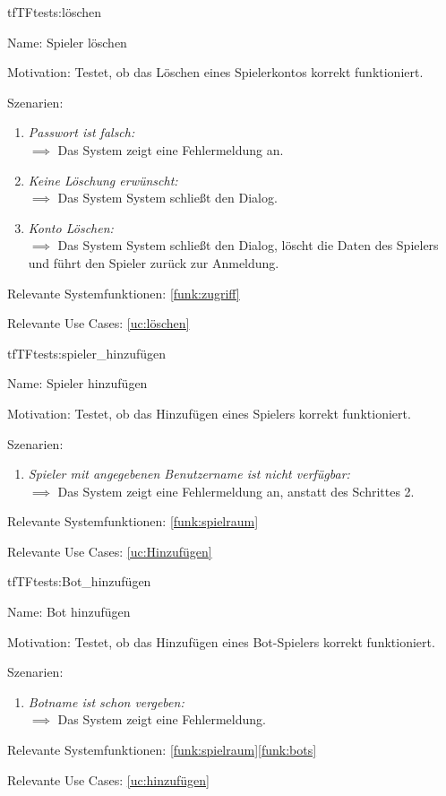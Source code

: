 \begin{description}[leftmargin=5em, style=sameline]
\begin{lhp}{tf}{TF}{tests:löschen}
	\item [Name:] Spieler löschen
	\item [Motivation:] Testet, ob das Löschen eines Spielerkontos korrekt funktioniert.
	\item [Szenarien:] \hfill
		\begin{enumerate}
		        \item \textit{Passwort ist falsch:} \\ $\implies$ Das System zeigt eine Fehlermeldung an.
				\item \textit{Keine Löschung erwünscht:} \\ $\implies$ Das System System schließt den Dialog.
				\item \textit{Konto Löschen:} \\ $\implies$ Das System System schließt den Dialog, löscht die Daten des Spielers und führt den Spieler zurück zur Anmeldung.
		\end{enumerate}
	\item [Relevante Systemfunktionen:] \ref{funk:zugriff}
	\item [Relevante Use Cases:] \ref{uc:löschen}
\end{lhp}

\begin{lhp}{tf}{TF}{tests:spieler_hinzufügen}
	\item [Name:] Spieler hinzufügen
	\item [Motivation:] Testet, ob das Hinzufügen eines Spielers korrekt funktioniert.
	\item [Szenarien:] \hfill
		\begin{enumerate}
		        \item \textit{Spieler mit angegebenen Benutzername ist nicht verfügbar:} \\ $\implies$ Das System zeigt eine Fehlermeldung an, anstatt des Schrittes 2.
		\end{enumerate}
	\item [Relevante Systemfunktionen:] \ref{funk:spielraum}
	\item [Relevante Use Cases:] \ref{uc:Hinzufügen}
\end{lhp}

\begin{lhp}{tf}{TF}{tests:Bot_hinzufügen}
	\item [Name:] Bot hinzufügen
	\item [Motivation:] Testet, ob das Hinzufügen eines Bot-Spielers korrekt funktioniert.
	\item [Szenarien:] \hfill
		\begin{enumerate}
		        \item \textit{Botname ist schon vergeben:}\\ $\implies$ Das System zeigt eine Fehlermeldung.
		\end{enumerate}
	\item [Relevante Systemfunktionen:] \ref{funk:spielraum}\ref{funk:bots}
	\item [Relevante Use Cases:] \ref{uc:hinzufügen}
\end{lhp}


\end{description}
